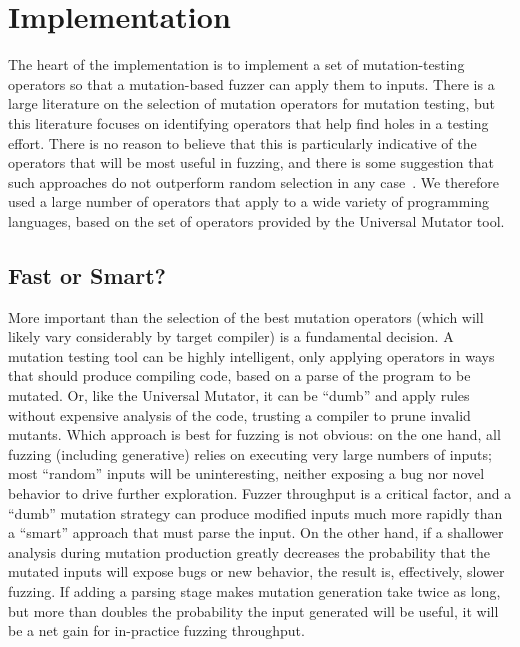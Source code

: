 \section{Implementation}
\label{implementation}

The heart of the implementation is to implement a set of mutation-testing operators
so that a mutation-based fuzzer can apply them to
inputs.  There is a large literature on the selection of mutation
operators for mutation testing, but this literature focuses on identifying
operators that help find holes in a testing effort.  There is no
reason to believe that this is particularly indicative of the
operators that will be most useful in fuzzing, and there is some
suggestion that such approaches do not outperform random selection in any case~\cite{MutReduct}.  We therefore 
used a large number of operators that apply to a wide variety of
programming languages, based on the set of operators provided by the
Universal Mutator tool.

\subsection{Fast or Smart?}

More important than the selection of the best mutation operators
(which will likely vary considerably by target compiler) is a
fundamental decision.  A mutation testing tool can be highly intelligent, only
applying operators in ways that should produce compiling code, based
on a parse of the program to be mutated.  Or, like the Universal
Mutator, it can be ``dumb'' and apply rules without expensive analysis
of the code, trusting a compiler to prune invalid
mutants.  Which approach is best for fuzzing is not obvious: on the
one hand, all fuzzing (including generative) relies on executing very
large numbers of inputs; most ``random'' inputs will be uninteresting,
neither exposing a bug nor novel behavior to drive further
exploration.  Fuzzer throughput is a critical factor, and a ``dumb''
mutation strategy can produce modified inputs much more rapidly than a
``smart'' approach that must parse the input.  On the other hand, if a
shallower analysis during mutation production greatly decreases the
probability that the mutated inputs will expose bugs or new behavior,
the result is, effectively, slower fuzzing.  If adding a parsing stage
makes mutation generation take twice as long, but more than doubles
the probability the input generated will be useful, it will be a net
gain for in-practice fuzzing throughput.

